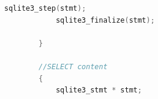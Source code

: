 \documentclass [11pt,a4paper,dvipdfmx] {jarticle}
\begin{document}
\begin{lstlisting}[language=C++]
            sqlite3_step(stmt);                                                                                                                                                                                                                                                         
            sqlite3_finalize(stmt);                                                                                                                                                                                                                                                     
                                                                                                                                                                                                                                                                                      
        }                                                                                                                                                                                                                                                                             
                                                                                                                                                                                                                                                                                      
        //SELECT content                                                                                                                                                                                                                                                              
        {                                                                                                                                                                                                                                                                             
            sqlite3_stmt * stmt;                                                                                                                                                                                                                                                        
                                                                                                                                                                                                                                                                                      

\end{lstlisting}
\end{document}
